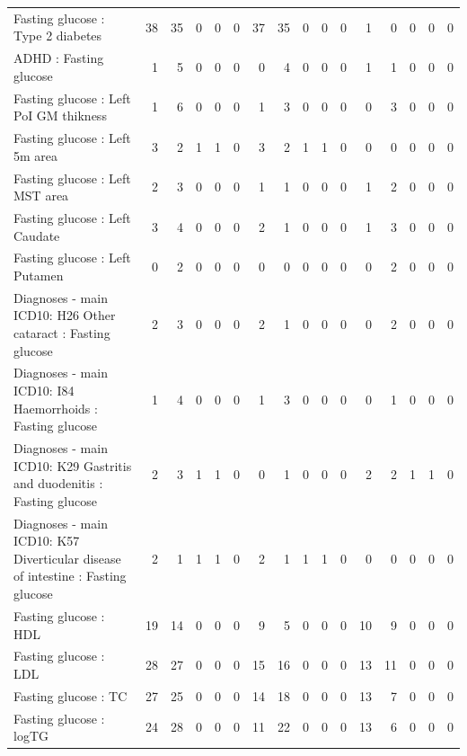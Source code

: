 \begin{table}[ht]
\begin{tabular}{lrrrrrrrrrrrrrrr}
  Fasting glucose : Type 2 diabetes &  38 &  35 &   0 &   0 &   0 &  37 &  35 &   0 &   0 &   0 &   1 &   0 &   0 &   0 &   0 \\ 
  ADHD : Fasting glucose &   1 &   5 &   0 &   0 &   0 &   0 &   4 &   0 &   0 &   0 &   1 &   1 &   0 &   0 &   0 \\ 
  Fasting glucose : Left PoI GM thikness &   1 &   6 &   0 &   0 &   0 &   1 &   3 &   0 &   0 &   0 &   0 &   3 &   0 &   0 &   0 \\ 
  Fasting glucose : Left 5m area &   3 &   2 &   1 &   1 &   0 &   3 &   2 &   1 &   1 &   0 &   0 &   0 &   0 &   0 &   0 \\ 
  Fasting glucose : Left MST area &   2 &   3 &   0 &   0 &   0 &   1 &   1 &   0 &   0 &   0 &   1 &   2 &   0 &   0 &   0 \\ 
  Fasting glucose : Left Caudate &   3 &   4 &   0 &   0 &   0 &   2 &   1 &   0 &   0 &   0 &   1 &   3 &   0 &   0 &   0 \\ 
  Fasting glucose : Left Putamen &   0 &   2 &   0 &   0 &   0 &   0 &   0 &   0 &   0 &   0 &   0 &   2 &   0 &   0 &   0 \\ 
  Diagnoses - main ICD10: H26 Other cataract : Fasting glucose &   2 &   3 &   0 &   0 &   0 &   2 &   1 &   0 &   0 &   0 &   0 &   2 &   0 &   0 &   0 \\ 
  Diagnoses - main ICD10: I84 Haemorrhoids : Fasting glucose &   1 &   4 &   0 &   0 &   0 &   1 &   3 &   0 &   0 &   0 &   0 &   1 &   0 &   0 &   0 \\ 
  Diagnoses - main ICD10: K29 Gastritis and duodenitis : Fasting glucose &   2 &   3 &   1 &   1 &   0 &   0 &   1 &   0 &   0 &   0 &   2 &   2 &   1 &   1 &   0 \\ 
  Diagnoses - main ICD10: K57 Diverticular disease of intestine : Fasting glucose &   2 &   1 &   1 &   1 &   0 &   2 &   1 &   1 &   1 &   0 &   0 &   0 &   0 &   0 &   0 \\ 
  Fasting glucose : HDL &  19 &  14 &   0 &   0 &   0 &   9 &   5 &   0 &   0 &   0 &  10 &   9 &   0 &   0 &   0 \\ 
  Fasting glucose : LDL &  28 &  27 &   0 &   0 &   0 &  15 &  16 &   0 &   0 &   0 &  13 &  11 &   0 &   0 &   0 \\ 
  Fasting glucose : TC &  27 &  25 &   0 &   0 &   0 &  14 &  18 &   0 &   0 &   0 &  13 &   7 &   0 &   0 &   0 \\ 
  Fasting glucose : logTG &  24 &  28 &   0 &   0 &   0 &  11 &  22 &   0 &   0 &   0 &  13 &   6 &   0 &   0 &   0 \\ 

\end{tabular}
\end{table}
